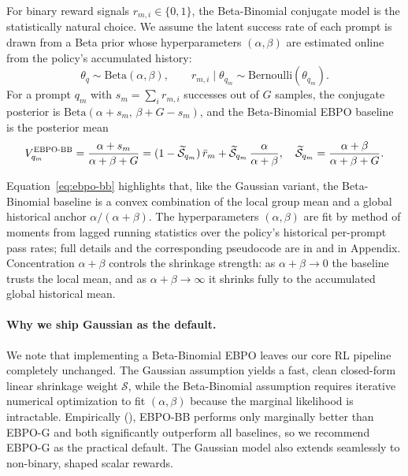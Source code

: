 \documentclass{article}
\theoremstyle{plain}
\theoremstyle{definition}
\theoremstyle{remark}
\newcommand{\oursG}{\textsc{EBPO-G}\xspace}
\newcommand{\oursBB}{\textsc{EBPO-BB}\xspace}
\begin{document}
For binary reward signals $r_{m,i}\in\{0,1\}$, the Beta-Binomial conjugate model is the statistically natural choice. We assume the latent success rate of each prompt is drawn from a Beta prior whose hyperparameters $(\alpha,\beta)$ are estimated online from the policy's accumulated history:
\begin{equation*}
    \theta_q \sim \mathrm{Beta}(\alpha, \beta), \qquad r_{m,i}\mid\theta_{q_m}\sim\mathrm{Bernoulli}(\theta_{q_m}).
\end{equation*}
For a prompt $q_m$ with $s_m=\sum_i r_{m,i}$ successes out of $G$ samples, the conjugate posterior is $\mathrm{Beta}(\alpha+s_m,\,\beta+G-s_m)$, and the Beta-Binomial EBPO baseline is the posterior mean
\begin{equation}
    V_{q_m}^{\oursBB} = \frac{\alpha + s_m}{\alpha + \beta + G}
                      = (1-\widetilde{\mathcal{S}}_{q_m})\,\bar r_m + \widetilde{\mathcal{S}}_{q_m}\,\frac{\alpha}{\alpha+\beta},
                      \quad \widetilde{\mathcal{S}}_{q_m}=\frac{\alpha+\beta}{\alpha+\beta+G}.
    \label{eq:ebpo-bb}
\end{equation}

Equation~\eqref{eq:ebpo-bb} highlights that, like the Gaussian variant, the Beta-Binomial baseline is a convex combination of the local group mean and a global historical anchor $\alpha/(\alpha+\beta)$. The hyperparameters $(\alpha,\beta)$ are fit by method of moments from lagged running statistics over the policy's historical per-prompt pass rates; full details and the corresponding pseudocode are in  and  in Appendix. Concentration $\alpha+\beta$ controls the shrinkage strength: as $\alpha+\beta \to 0$ the baseline trusts the local mean, and as $\alpha+\beta \to \infty$ it shrinks fully to the accumulated global historical mean.

\paragraph{Why we ship Gaussian as the default.} We note that implementing a Beta-Binomial EBPO leaves our core RL pipeline completely unchanged. The Gaussian assumption yields a fast, clean closed-form linear shrinkage weight $\mathcal{S}$, while the Beta-Binomial assumption requires iterative numerical optimization to fit $(\alpha,\beta)$ because the marginal likelihood is intractable. Empirically (), \oursBB performs only marginally better than \oursG and both significantly outperform all baselines, so we recommend \oursG as the practical default. The Gaussian model also extends seamlessly to non-binary, shaped scalar rewards. 
\end{document}
